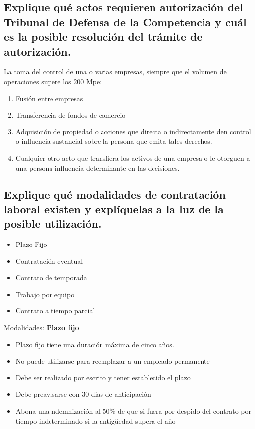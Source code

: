 \documentclass{article}
\begin{document}
\subsection{Explique qué actos requieren autorización del Tribunal de Defensa de la Competencia y cuál es la posible resolución del trámite de autorización.}
La toma del control de una o varias empresas, siempre que el volumen de operaciones supere los $200$ Mpe:
\begin{enumerate}
\item Fusión entre empresas
\item Transferencia de fondos de comercio
\item Adquisición de propiedad o acciones que directa o indirectamente den control o influencia sustancial sobre la persona que emita tales derechos.
\item Cualquier otro acto que transfiera los activos de una empresa o le otorguen a una persona influencia determinante en las decisiones.
\end{enumerate}

\subsection{Explique qué modalidades de contratación laboral existen y  explíquelas a la luz de la posible utilización.}

\begin{itemize}
\item Plazo Fijo
\item Contratación eventual
\item Contrato de temporada
\item Trabajo por equipo
\item Contrato a tiempo parcial
\end{itemize}
Modalidades:
\textbf{Plazo fijo}
\begin{itemize}
	\item Plazo fijo tiene una duraci\'on máxima de cinco años. 
	\item No puede utilizarse para reemplazar a un empleado permanente
	\item Debe ser realizado por escrito y tener establecido el plazo
	\item Debe preavisarse con 30 dias de anticipación
	\item Abona una ndemnización al 50\% de que si fuera por despido del contrato por tiempo indeterminado si la antigüedad supera el año
\end{itemize}
\end{document}
